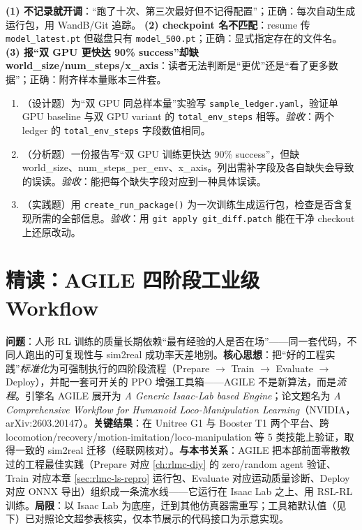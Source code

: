 \begin{pitfall}[三个实验管理高频坑]
\textbf{(1) 不记录就开调}：“跑了十次、第三次最好但不记得配置”；正确：每次自动生成运行包，用 WandB/Git 追踪。
\textbf{(2) checkpoint 名不匹配}：resume 传 \verb|model_latest.pt| 但磁盘只有 \verb|model_500.pt|；正确：显式指定存在的文件名。
\textbf{(3) 报“双 GPU 更快达 90\% success”却缺 world\_size/num\_steps/x\_axis}：读者无法判断是“更优”还是“看了更多数据”；正确：附齐样本量账本三件套。
\end{pitfall}

\begin{practice}[实验管理练习]
\begin{enumerate}
\item （设计题）为“双 GPU 同总样本量”实验写 \verb|sample_ledger.yaml|，验证单 GPU baseline 与双 GPU variant 的 \verb|total_env_steps| 相等。\emph{验收}：两个 ledger 的 \verb|total_env_steps| 字段数值相同。
\item （分析题）一份报告写“双 GPU 训练更快达 90\% success”，但缺 world\_size、num\_steps\_per\_env、x\_axis。列出需补字段及各自缺失会导致的误读。\emph{验收}：能把每个缺失字段对应到一种具体误读。
\item （实践题）用 \verb|create_run_package()| 为一次训练生成运行包，检查是否含复现所需的全部信息。\emph{验收}：用 \verb|git apply git_diff.patch| 能在干净 checkout 上还原改动。
\end{enumerate}
\end{practice}

\section{精读：AGILE 四阶段工业级 Workflow}
\label{sec:rlmc-ls-agile}

\begin{paper}\label{paper:rlmc-ls-agile}
\textbf{问题}：人形 RL 训练的质量长期依赖“最有经验的人是否在场”——同一套代码，不同人跑出的可复现性与 sim2real 成功率天差地别。\textbf{核心思想}：把“好的工程实践”\emph{标准化}为可强制执行的四阶段流程（Prepare $\to$ Train $\to$ Evaluate $\to$ Deploy），并配一套可开关的 PPO 增强工具箱——AGILE 不是新算法，而是\emph{流程}。引擎名 AGILE 展开为 \emph{A Generic Isaac-Lab based Engine}；论文题名为 \emph{A Comprehensive Workflow for Humanoid Loco-Manipulation Learning}（NVIDIA，arXiv:2603.20147）\cite{zhao2026agile}。\textbf{关键结果}：在 Unitree G1 与 Booster T1 两个平台、跨 locomotion/recovery/motion-imitation/loco-manipulation 等 5 类技能上验证，取得一致的 sim2real 迁移（经联网核对）。\textbf{与本书关系}：AGILE 把本部前面零散教过的工程最佳实践（Prepare 对应 \cref{ch:rlmc-diy} 的 zero/random agent 验证、Train 对应本章 \cref{sec:rlmc-ls-repro} 运行包、Evaluate 对应运动质量诊断、Deploy 对应 ONNX 导出）组织成一条流水线——它运行在 Isaac Lab 之上、用 RSL-RL 训练。\textbf{局限}：以 Isaac Lab 为底座，迁到其他仿真器需重写；工具箱默认值（见下）已对照论文超参表核实，仅本节展示的代码接口为示意实现。
\end{paper}

